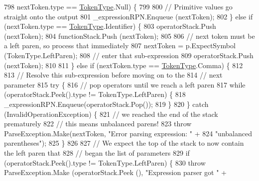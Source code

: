 \begin{DoxyCode}
798                         nextToken.type == \hyperlink{a00026_a301aa7c866593a5b625a8fc158bbeace}{TokenType}.Null) \{
799 
800                         \textcolor{comment}{// Primitive values go straight onto the output}
801                         \_expressionRPN.Enqueue (nextToken);
802                     \} \textcolor{keywordflow}{else} \textcolor{keywordflow}{if} (nextToken.type == \hyperlink{a00026_a301aa7c866593a5b625a8fc158bbeace}{TokenType}.Identifier) \{
803                         operatorStack.Push (nextToken);
804                         functionStack.Push (nextToken);
805 
806                         \textcolor{comment}{// next token must be a left paren, so process that immediately}
807                         nextToken = p.ExpectSymbol (TokenType.LeftParen);
808                         \textcolor{comment}{// enter that sub-expression}
809                         operatorStack.Push (nextToken);
810 
811                     \} \textcolor{keywordflow}{else} \textcolor{keywordflow}{if} (nextToken.type == \hyperlink{a00026_a301aa7c866593a5b625a8fc158bbeace}{TokenType}.Comma) \{
812 
813                         \textcolor{comment}{// Resolve this sub-expression before moving on to the}
814                         \textcolor{comment}{// next parameter}
815                         \textcolor{keywordflow}{try} \{
816                             \textcolor{comment}{// pop operators until we reach a left paren}
817                             \textcolor{keywordflow}{while} (operatorStack.Peek().type != TokenType.LeftParen) \{
818                                 \_expressionRPN.Enqueue(operatorStack.Pop());
819                             \}
820                         \} \textcolor{keywordflow}{catch} (InvalidOperationException) \{
821                             \textcolor{comment}{// we reached the end of the stack prematurely}
822                             \textcolor{comment}{// this means unbalanced parens!}
823                             \textcolor{keywordflow}{throw} ParseException.Make(nextToken, \textcolor{stringliteral}{"Error parsing expression: "} +
824                                 \textcolor{stringliteral}{"unbalanced parentheses"});
825                         \}
826 
827                         \textcolor{comment}{// We expect the top of the stack to now contain the left paren that }
828                         \textcolor{comment}{// began the list of parameters}
829                         \textcolor{keywordflow}{if} (operatorStack.Peek().type != TokenType.LeftParen) \{
830                             \textcolor{keywordflow}{throw} ParseException.Make (operatorStack.Peek (), \textcolor{stringliteral}{"Expression parser got "} +

\end{DoxyCode}
